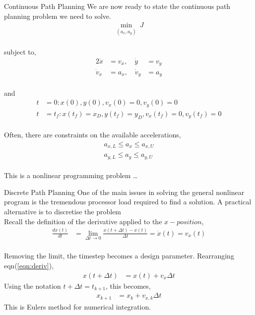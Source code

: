 \begin{frame}{Continuous Path Planning}
	We are now ready to state the continuous path planning problem we need to solve.\\
	\vspace{-20pt}
	\begin{align*}
	\min_{(a_x,a_y)} \: J
	\end{align*}\\
	\vspace{-10pt}
	subject to,
	\vspace{-10pt}
	\begin{alignat*}{2}
	\dot{x} &= v_x,\quad \dot{y} &= v_y\\
	\dot{v}_x &= a_x, \quad \dot{v}_y &= a_y
	\end{alignat*}\\
	\vspace{-10pt}
	and\\
	\vspace{-20pt}
	\begin{align*}
	t&=0: x(0),y(0),v_x(0)=0, v_y(0)=0\\
	t&=t_f: x(t_f)=x_D,y(t_f)=y_D,v_x(t_f)=0, v_y(t_f)=0
	\end{align*}\\
	Often, there are constraints on the available accelerations,
	\vspace{-10pt}
	\begin{align*}
	a_{x,L} \leq a_x \leq a_{x,U}\\
	a_{y,L} \leq a_y \leq a_{y,U}
	\end{align*}\\
	\vspace{-5pt}
	This is a {\color{red} nonlinear programming} problem \ldots
\end{frame}

\begin{frame}{Discrete Path Planning}
	One of the main issues in solving the general nonlinear program is the tremendous processor load required to find a solution. A practical alternative is to {\color{red}discretise} the problem\\
	Recall the definition of the derivative applied to the $x-position$,
	\begin{align}
	\frac{dx(t)}{dt} &= \lim_{\Delta t \rightarrow 0}\frac{x(t+\Delta t)-x(t)}{\Delta t} = \dot{x}(t) = v_x(t) \label{eqn:deriv}
	\end{align}\\
	Removing the limit, the timestep becomes a design parameter. Rearranging eqn(\ref{eqn:deriv}),
	\begin{align*}
	x(t+\Delta t) &= x(t) + v_x \Delta t
	\end{align*}
	Using the notation $t+\Delta t = t_{k+1}$, this becomes,
	\begin{align}
	x_{k+1} &= x_k + v_{x,k} \Delta t
	\end{align}
	This is Eulers method for numerical integration.
\end{frame}

